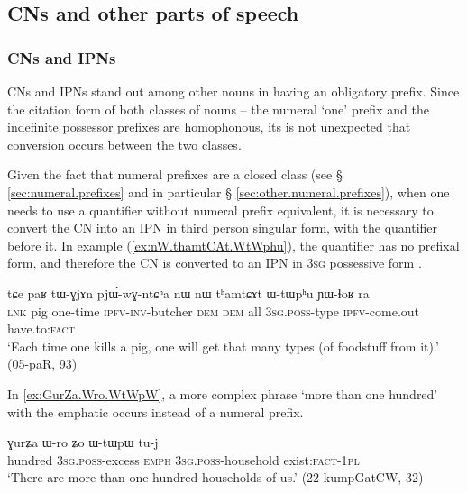 \subsection{CNs and other parts of speech} \label{sec:CN.parts.of.speech}
\subsubsection{CNs and IPNs}   \label{sec:CN.IPN}
CNs and IPNs stand out among other nouns in having an obligatory prefix. Since the citation form of both classes of nouns -- the numeral `one' prefix  and the indefinite possessor prefixes  are homophonous, its is not unexpected that conversion occurs between the two classes. 

Given the fact that numeral prefixes are a closed class (see § \ref{sec:numeral.prefixes} and in particular § \ref{sec:other.numeral.prefixes}), when one needs to use a quantifier without numeral prefix equivalent, it is necessary to convert the CN into an IPN in third person singular form, with the quantifier before it. In example (\ref{ex:nW.thamtCAt.WtWphu}), the quantifier  has no prefixal form, and therefore the CN  is converted to an IPN in \textsc{3sg} possessive form .

\begin{exe}
\ex \label{ex:nW.thamtCAt.WtWphu}
 \gll tɕe paʁ tɯ-ɣjɤn pjɯ́-wɣ-ntɕʰa nɯ nɯ tʰamtɕɤt ɯ-tɯpʰu ɲɯ-ɬoʁ ra \\ 
 \textsc{lnk} pig one-time \textsc{ipfv}-\textsc{inv}-butcher \textsc{dem} \textsc{dem} all \textsc{3sg}.\textsc{poss}-type \textsc{ipfv}-come.out have.to:\textsc{fact} \\
\glt `Each time one kills a pig, one will get that many types (of foodstuff from it).' (05-paR, 93)
\end{exe}

In \ref{ex:GurZa.Wro.WtWpW}, a more complex phrase  `more than one hundred' with the emphatic  occurs instead of a numeral prefix.

\begin{exe}
\ex \label{ex:GurZa.Wro.WtWpW}
 \gll ɣurʑa ɯ-ro ʑo ɯ-tɯpɯ tu-j \\
 hundred \textsc{3sg}.\textsc{poss}-excess \textsc{emph} \textsc{3sg}.\textsc{poss}-household exist:\textsc{fact}-\textsc{1pl} \\
\glt `There are more than one hundred households of us.' (22-kumpGatCW, 32)
\end{exe}

